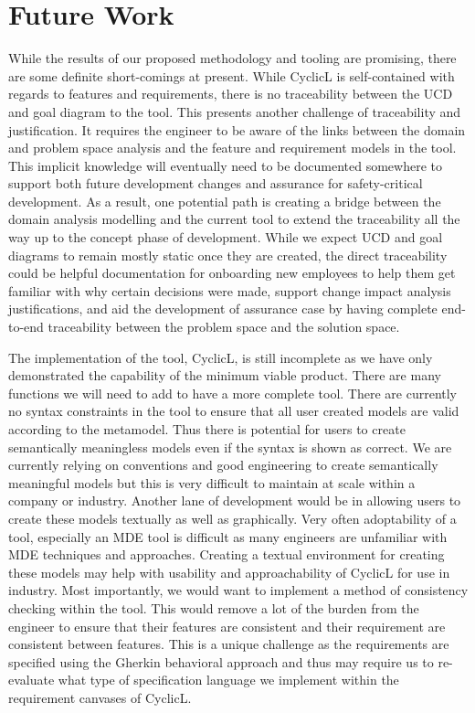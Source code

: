 \chapter{Future Work}

While the results of our proposed methodology and tooling are promising, there are some definite short-comings at present. While CyclicL is self-contained with regards to features and requirements, there is no traceability between the \ac{UCD} and goal diagram to the tool. This presents another challenge of traceability and justification. It requires the engineer to be aware of the links between the domain and problem space analysis and the feature and requirement models in the tool. This implicit knowledge will eventually need to be documented somewhere to support both future development changes and assurance for safety-critical development. As a result, one potential path is creating a bridge between the domain analysis modelling and the current tool to extend the traceability all the way up to the concept phase of development. While we expect \ac{UCD} and goal diagrams to remain mostly static once they are created, the direct traceability could be helpful documentation for onboarding new employees to help them get familiar with why certain decisions were made, support change impact analysis justifications, and aid the development of assurance case by having complete end-to-end traceability between the problem space and the solution space.

The implementation of the tool, CyclicL, is still incomplete as we have only demonstrated the capability of the minimum viable product. There are many functions we will need to add to have a more complete tool. There are currently no syntax constraints in the tool to ensure that all user created models are valid according to the metamodel. Thus there is potential for users to create semantically meaningless models even if the syntax is shown as correct. We are currently relying on conventions and good engineering to create semantically meaningful models but this is very difficult to maintain at scale within a company or industry. Another lane of development would be in allowing users to create these models textually as well as graphically. Very often adoptability of a tool, especially an \ac{MDE} tool is difficult as many engineers are unfamiliar with \ac{MDE} techniques and approaches. Creating a textual environment for creating these models may help with usability and approachability of CyclicL for use in industry. Most importantly, we would want to implement a method of consistency checking within the tool. This would remove a lot of the burden from the engineer to ensure that their features are consistent and their requirement are consistent between features. This is a unique challenge as the requirements are specified using the Gherkin behavioral approach and thus may require us to re-evaluate what type of specification language we implement within the requirement canvases of CyclicL.



